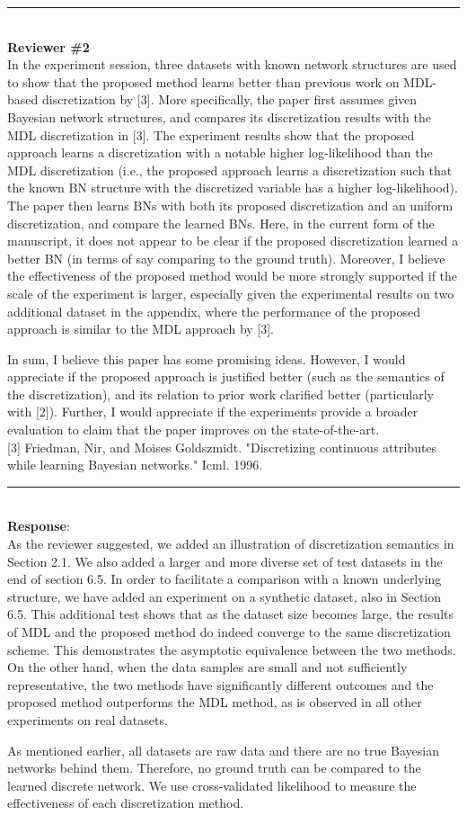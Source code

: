 \documentclass{article}
\begin{document}
\noindent\rule{8cm}{0.4pt}\\
{\bf Reviewer \#2} \\

In the experiment session, three datasets with known network structures are used to show that the proposed method learns better than previous work on MDL-based discretization by [3]. More specifically, the paper first assumes given Bayesian network structures, and compares its discretization results with the MDL discretization in [3]. The experiment results show that the proposed approach learns a discretization with a notable higher log-likelihood than the MDL discretization (i.e., the proposed approach learns a discretization such that the known BN structure with the discretized variable has a higher log-likelihood). The paper then learns BNs with both its proposed discretization and an uniform discretization, and compare the learned BNs. Here, in the current form of the manuscript, it does not appear to be clear if the proposed discretization learned a better BN (in terms of say comparing to the ground truth). Moreover, I believe the effectiveness of the proposed method would be more strongly supported if the scale of the experiment is larger, especially given the experimental results on two additional dataset in the appendix, where the performance of the proposed approach is similar to the MDL approach by [3].

In sum, I believe this paper has some promising ideas. However, I would appreciate if the proposed approach is justified better (such as the semantics of the discretization), and its relation to prior work clarified better (particularly with [2]). Further, I would appreciate if the experiments provide a broader evaluation to claim that the paper improves on the state-of-the-art.\\

[3] Friedman, Nir, and Moises Goldszmidt. "Discretizing continuous attributes while learning Bayesian networks." Icml. 1996.

\noindent\rule{8cm}{0.4pt}\\
{\bf Response}:\\

As the reviewer suggested, we added an illustration of discretization semantics in Section 2.1.
We also added a larger and more diverse set of test datasets in the end of section 6.5.
In order to facilitate a comparison with a known underlying structure, we have added an experiment on a synthetic dataset, also in Section 6.5.
This additional test shows that as the dataset size becomes large, the results of MDL and the proposed method do indeed converge to the same discretization scheme.
This demonstrates the asymptotic equivalence between the two methods.
On the other hand, when the data samples are small and not sufficiently representative, the two methods have significantly different outcomes and the proposed method outperforms the MDL method, as is observed in all other experiments on real datasets.

As mentioned earlier, all datasets are raw data and there are no true Bayesian networks behind them. Therefore, no ground truth can be compared to the learned discrete network. We use cross-validated likelihood to measure the effectiveness of each discretization method.
\end{document}
